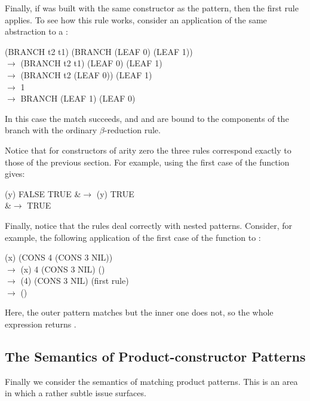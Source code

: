 Finally, if  was built with the same constructor as the pattern, then the first rule applies. To see how this rule works, consider an application of the same abstraction to a :
\begin{mlcoded}
    (BRANCH t2 t1) (BRANCH (LEAF 0) (LEAF 1)) \\
    $\rightarrow$ (BRANCH t2 t1) (LEAF 0) (LEAF 1) \\
    $\rightarrow$ (BRANCH t2 (LEAF 0)) (LEAF 1) \\
    $\rightarrow$ 1 \\
    $\rightarrow$ BRANCH (LEAF 1) (LEAF 0)
\end{mlcoded}
In this case the match succeeds, and  and  are bound to the components of the branch with the ordinary $\beta$-reduction rule.

Notice that for constructors of arity zero  the three rules correspond exactly to those of the previous section. For example, using the first case of the  function gives:
\begin{mlalign}
    (y) FALSE TRUE &$\rightarrow$ (y) TRUE \\
    &$\rightarrow$ TRUE
\end{mlalign}
Finally, notice that the rules deal correctly with nested patterns. Consider, for example, the following application of the first case of the function  to :
\begin{mlcoded}
    (x) (CONS 4 (CONS 3 NIL))\\
    $\rightarrow$ (x) 4 (CONS 3 NIL) () \\
    $\rightarrow$ (4) (CONS 3 NIL) (first rule)\\
    $\rightarrow$  \quad ()
\end{mlcoded}
Here, the outer pattern matches but the inner one does not, so the whole expression returns .

\subsection{The Semantics of Product-constructor Patterns}
Finally we consider the semantics of matching product patterns. This is an area in which a rather subtle issue surfaces.

